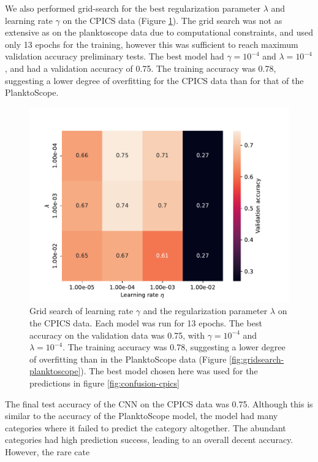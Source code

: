 We also performed grid-search for the best regularization parameter $\lambda$ and learning rate $\gamma$ on the CPICS data (Figure \ref{fig:gridsearch-cpics}). The grid search was not as extensive as on the planktoscope data due to computational constraints, and used only 13 epochs for the training, however this was sufficient to reach maximum validation accuracy preliminary tests. The best model had $\gamma=10^{-4}$ and $\lambda=10^{-4}$, and had a validation accuracy of 0.75. The training accuracy was 0.78, suggesting a lower degree of overfitting for the CPICS data than for that of the PlanktoScope.

\begin{figure}
    \centering
    \includegraphics[width=\linewidth]{examples/tests_even/figs/gridsearch-128-2024-12-09_1113a.pdf}
    \caption{Grid search of learning rate $\gamma$ and the regularization parameter $\lambda$ on the CPICS data. Each model was run for 13 epochs. The best accuracy on the validation data was 0.75, with $\gamma = 10^{-4}$ and $\lambda=10^{-4}$. The training accuracy was 0.78, suggesting a lower degree of overfitting than in the PlanktoScope data (Figure \ref{fig:gridsearch-planktoscope}). The best model chosen here was used for the predictions in figure \ref{fig:confusion-cpics}}
    \label{fig:gridsearch-cpics}
\end{figure}

The final test accuracy of the CNN on the CPICS data was 0.75. Although this is similar to the accuracy of the PlanktoScope model, the model had many categories where it failed to predict the category altogether. The abundant categories had high prediction success, leading to an overall decent accuracy. However, the rare cate

